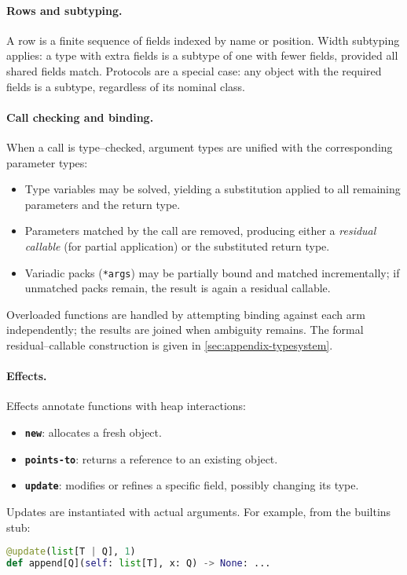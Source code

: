 \paragraph{Rows and subtyping.}
A row is a finite sequence of fields indexed by name or position.  
Width subtyping applies: a type with extra fields is a subtype of one with fewer fields, provided all shared fields match.  
Protocols are a special case: any object with the required fields is a subtype, regardless of its nominal class.

\paragraph{Call checking and binding.}
When a call is type--checked, argument types are unified with the corresponding parameter types:
\begin{itemize}
  \item Type variables may be solved, yielding a substitution applied to all remaining parameters and the return type.
  \item Parameters matched by the call are removed, producing either a \emph{residual callable} (for partial application) or the substituted return type.
  \item Variadic packs (\texttt{*args}) may be partially bound and matched incrementally; if unmatched packs remain, the result is again a residual callable.
\end{itemize}
Overloaded functions are handled by attempting binding against each arm independently; the results are joined when ambiguity remains.  
The formal residual--callable construction is given in \autoref{sec:appendix-typesystem}.

\paragraph{Effects.}
Effects annotate functions with heap interactions:
\begin{itemize}
  \item \textbf{\texttt{new}}: allocates a fresh object.
  \item \textbf{\texttt{points-to}}: returns a reference to an existing object.
  \item \textbf{\texttt{update}}: modifies or refines a specific field, possibly changing its type.
\end{itemize}
Updates are instantiated with actual arguments. For example, from the builtins stub:

\begin{lstlisting}[language=python]
@update(list[T | Q], 1)
def append[Q](self: list[T], x: Q) -> None: ...
\end{lstlisting}

